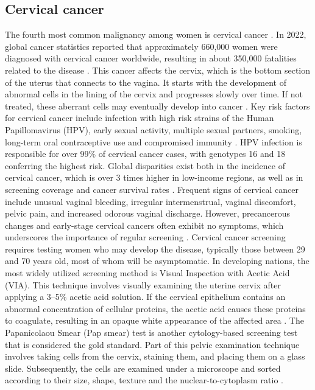 \documentclass{svjour3}
\begin{document}
\subsection{Cervical cancer}
The fourth most common malignancy among women is cervical cancer \cite{ref1}. In 2022, global cancer statistics reported that approximately 660,000 women were diagnosed with cervical cancer worldwide, resulting in about 350,000 fatalities related to the disease \cite{ref2}. This cancer affects the cervix, which is the bottom section of the uterus that connects to the vagina. It starts with the development of abnormal cells in the lining of the cervix and progresses slowly over time. If not treated, these aberrant cells may eventually develop into cancer \cite{ref3}. Key risk factors for cervical cancer include infection with high risk strains of the Human Papillomavirus (HPV), early sexual activity, multiple sexual partners, smoking, long-term oral contraceptive use and compromised immunity \cite{ref4}. HPV infection is responsible for over 99\% of cervical cancer cases, with genotypes 16 and 18 conferring the highest risk. Global disparities exist both in the incidence of cervical cancer, which is over 3 times higher in low-income regions, as well as in screening coverage and cancer survival rates \cite{ref5}. Frequent signs of cervical cancer include unusual vaginal bleeding, irregular intermenstrual, vaginal discomfort, pelvic pain, and increased odorous vaginal discharge. However, precancerous changes and early-stage cervical cancers often exhibit no symptoms, which underscores the importance of regular screening \cite{ref6}.
Cervical cancer screening requires testing women who may develop the disease, typically those between 29 and 70 years old, most of whom will be asymptomatic. In developing nations, the most widely utilized screening method is Visual Inspection with Acetic Acid (VIA). This technique involves visually examining the uterine cervix after applying a 3–5\% acetic acid solution. If the cervical epithelium contains an abnormal concentration of cellular proteins, the acetic acid causes these proteins to coagulate, resulting in an opaque white appearance of the affected area \cite{ref7}. The Papanicolaou Smear (Pap smear) test is another cytology-based screening test that is considered the gold standard. Part of this pelvic examination technique involves taking cells from the cervix, staining them, and placing them on a glass slide. Subsequently, the cells are examined under a microscope and sorted according to their size, shape, texture and the nuclear-to-cytoplasm ratio \cite{ref8}.
\end{document}
